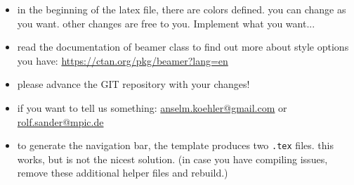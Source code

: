 \documentclass[usepdftitle=false,unknownkeysallowed,8pt]{beamer}
\begin{document}
\begin{frame}
  
      \begin{itemize}
        \item in the beginning of the latex file, there are colors defined. you can change as you want. other changes are free to you. Implement what you want...

        \item read the documentation of beamer class to find out more about style options you have: \url{https://ctan.org/pkg/beamer?lang=en}

        \item please advance the GIT repository with your changes!
        \item if you want to tell us something: \url{anselm.koehler@gmail.com} or
        \url{rolf.sander@mpic.de}
      \end{itemize}
      
\end{frame}


\begin{frame}
  
      \begin{itemize}
        \item to generate the navigation bar, the template produces two \texttt{.tex} files. this works, but is not the nicest solution. (in case you have compiling issues, remove these additional helper files and rebuild.)
      \end{itemize}
      
\end{frame}
\end{document}
